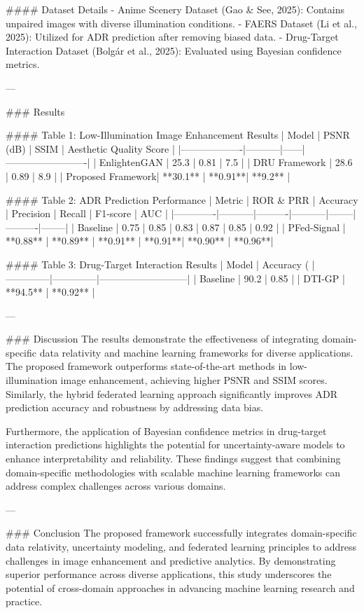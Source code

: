 #### Dataset Details
- Anime Scenery Dataset (Gao & See, 2025): Contains unpaired images with diverse illumination conditions.
- FAERS Dataset (Li et al., 2025): Utilized for ADR prediction after removing biased data.
- Drug-Target Interaction Dataset (Bolgár et al., 2025): Evaluated using Bayesian confidence metrics.

---

### Results

#### Table 1: Low-Illumination Image Enhancement Results
| Model            | PSNR (dB) | SSIM | Aesthetic Quality Score |
|-------------------|-----------|------|-------------------------|
| EnlightenGAN      | 25.3      | 0.81 | 7.5                     |
| DRU Framework     | 28.6      | 0.89 | 8.9                     |
| Proposed Framework| **30.1**  | **0.91**| **9.2**               |

#### Table 2: ADR Prediction Performance
| Metric      | ROR & PRR | Accuracy | Precision | Recall | F1-score | AUC    |
|-------------|-----------|----------|-----------|--------|----------|--------|
| Baseline    | 0.75      | 0.85     | 0.83      | 0.87   | 0.85     | 0.92   |
| PFed-Signal | **0.88**  | **0.89** | **0.91**  | **0.91**| **0.90** | **0.96**|

#### Table 3: Drug-Target Interaction Results
| Model        | Accuracy (%
|--------------|--------------|---------------------------|
| Baseline     | 90.2         | 0.85                      |
| DTI-GP       | **94.5**     | **0.92**                  |

---

### Discussion
The results demonstrate the effectiveness of integrating domain-specific data relativity and machine learning frameworks for diverse applications. The proposed framework outperforms state-of-the-art methods in low-illumination image enhancement, achieving higher PSNR and SSIM scores. Similarly, the hybrid federated learning approach significantly improves ADR prediction accuracy and robustness by addressing data bias. 

Furthermore, the application of Bayesian confidence metrics in drug-target interaction predictions highlights the potential for uncertainty-aware models to enhance interpretability and reliability. These findings suggest that combining domain-specific methodologies with scalable machine learning frameworks can address complex challenges across various domains.

---

### Conclusion
The proposed framework successfully integrates domain-specific data relativity, uncertainty modeling, and federated learning principles to address challenges in image enhancement and predictive analytics. By demonstrating superior performance across diverse applications, this study underscores the potential of cross-domain approaches in advancing machine learning research and practice.

